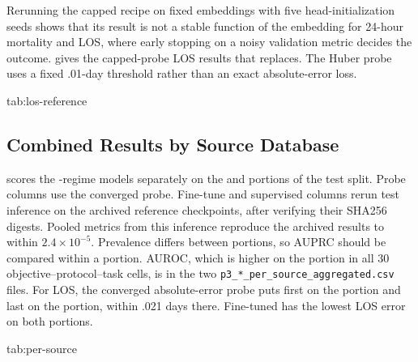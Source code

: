 Rerunning the capped recipe on fixed embeddings with five head-initialization seeds shows that its result is not a stable function of the embedding for 24-hour mortality and LOS, where early stopping on a noisy validation metric decides the outcome.  gives the capped-probe LOS results that  replaces. The Huber probe uses a fixed .01-day threshold rather than an exact absolute-error loss.

\begin{table}[htbp]
\floatconts
  {tab:los-reference}
  {\caption{Capped-probe LOS results from the archived results, superseded for probing by . Absolute error in days, mean (sample SD), $n=5$. Probes train with squared error for at most 50 epochs and are selected on validation absolute error. The constant predicts each seed's training-label median. Duplicate logs are collapsed by dataset and seed. Bold marks the lowest model mean within a protocol.}}
  {\scriptsize
  }
\end{table}

\subsection{Combined Results by Source Database}
\label{app:per-source}

 scores the \Combined{}-regime models separately on the \MIMIC{} and \EICU{} portions of the \Combined{} test split. Probe columns use the converged probe. Fine-tune and supervised columns rerun test inference on the archived reference checkpoints, after verifying their SHA256 digests. Pooled metrics from this inference reproduce the archived results to within $2.4\times10^{-5}$. Prevalence differs between portions, so AUPRC should be compared within a portion. AUROC, which is higher on the \MIMIC{} portion in all 30 objective--protocol--task cells, is in the two \texttt{p3\_*\_per\_source\_aggregated.csv} files. For LOS, the converged absolute-error probe puts \MAE{} first on the \EICU{} portion and last on the \MIMIC{} portion, within .021 days there. Fine-tuned \MAE{} has the lowest LOS error on both portions.

\begin{table}[htbp]
\floatconts
  {tab:per-source}
  {\caption{\Combined{}-regime models scored separately on the two source portions of the \Combined{} test split. Means over five seeds. Classification uses AUPRC. LOS uses absolute error in days, with the Huber probe in the probe columns. Prev.\ is the mean test prevalence of the portion. Bold marks the best mean within each protocol.}}
  {\scriptsize
  }
\end{table}

